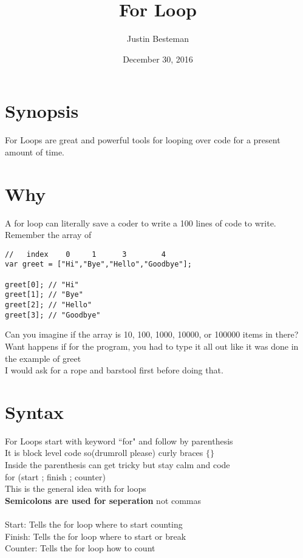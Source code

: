\documentclass[12pt, letterpaper]{article}
\title{For Loop }
\author{Justin Besteman}
\date{December 30, 2016}
\begin{document}
\maketitle


\section*{Synopsis}

For Loops are great and powerful tools for looping over code for a present amount of time.\\

\section*{Why}

A for loop can literally save a coder to write a 100 lines of code to write. \\
Remember the array of 

\begin{lstlisting}
//   index    0     1      3        4
var greet = ["Hi","Bye","Hello","Goodbye"];

greet[0]; // "Hi"
greet[1]; // "Bye"
greet[2]; // "Hello"
greet[3]; // "Goodbye"
\end{lstlisting}
Can you imagine if the array is 10, 100, 1000, 10000, or 100000 items in there?
Want happens if for the program, you had to type it all out like it was done in the example of greet \\
I would ask for a rope and barstool first before doing that.\\
\section*{Syntax}

For Loops start with keyword ``for" and follow by parenthesis\\
It is block level code so(drumroll please) curly braces $\lbrace\rbrace$ \\
Inside the parenthesis can get tricky but stay calm and code\\
for (start ; finish ; counter) \\
This is the general idea with for loops \\
\textbf{Semicolons are used for seperation} not commas\\
\\
Start: Tells the for loop where to start counting\\
Finish: Tells the for loop where to start or break\\
Counter: Tells the for loop how to count\\
\end{document}
